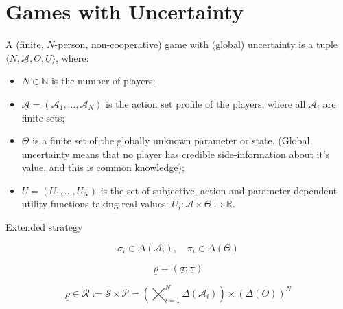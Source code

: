 \documentclass{beamer}
\theoremstyle{definition}
\begin{document}
\section{Games with Uncertainty}




\begin{frame}{}

\begin{definition}
\label{def:GameWithUncertainty}
A (finite, $N$-person, non-cooperative) game with (global) uncertainty is a tuple $\langle N, \underline{\mathcal{A}}, \Theta, \underline{U} \rangle$, where:

\begin{itemize}
    \item $N \in \mathbb{N}$ is the number of players;
    \item $\underline{\mathcal{A}} = (\mathcal{A}_1,\dots,\mathcal{A}_N)$ is the action set profile of the players, where all $\mathcal{A}_i$ are finite sets;
    \item $\Theta$ is a finite set of the globally unknown parameter or state. (Global uncertainty means that no player has credible side-information about it's value, and this is common knowledge);
    \item $\underline{U} = (U_1,\dots,U_N)$ is the set of subjective, action and parameter-dependent utility functions taking real values: $U_i : \underline{\mathcal{A}} \times \Theta \mapsto \mathbb{R}$.
\end{itemize}
    
\end{definition}

\end{frame}


\begin{frame}{Extended strategy}

    \begin{equation}
        \sigma_i \in \Delta(\mathcal{A}_i), \quad \pi_i \in \Delta(\Theta)
    \end{equation}

\begin{equation}
        \underline{\rho} = ( \underline{\sigma}; \underline{\pi} )
    \end{equation}

    
    \begin{equation}
        \underline{\rho} \in 
        \mathcal{R} :=
        \mathcal{S} \times \mathcal{P} =
        \left ( \bigtimes_{i=1}^N \Delta(\mathcal{A}_i) \right ) \times
        \left ( \Delta(\Theta) \right )^N
    \end{equation}

    
\end{frame}
\end{document}
